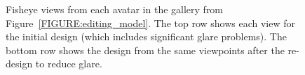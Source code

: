 \documentclass[10pt,twocolumn,letterpaper]{article}
\begin{document}
\begin{figure}[t]

\caption{Fisheye views from each avatar in
  the gallery from Figure~\ref{FIGURE:editing_model}.  The top row shows each view for
  the initial design (which includes significant glare problems).  The
  bottom row shows the design from the same viewpoints after the re-design to reduce glare.}
\vspace{-0.15in}
\label{FIGURE:museum2}
\end{figure}
\end{document}
